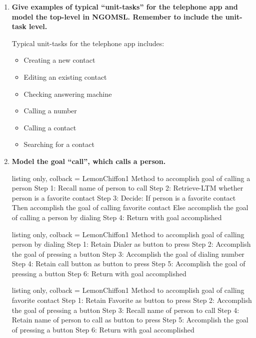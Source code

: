 \begin{enumerate}
\item \textbf{Give examples of typical ``unit-tasks'' for the telephone app and model the top-level in \ac{NGOMSL}. Remember to include the unit-task level.}

Typical unit-tasks for the telephone app includes:

\begin{itemize}
\item Creating a new contact
\item Editing an existing contact
\item Checking answering machine
\item Calling a number
\item Calling a contact
\item Searching for a contact
\end{itemize}

\item \textbf{Model the goal ``call'', which calls a person.}

\begin{tcblisting}{
    listing only,
    colback = LemonChiffon1
}
Method to accomplish goal of calling a person
Step 1: Recall name of person to call
Step 2: Retrieve-LTM whether person is a favorite contact
Step 3: Decide: If person is a favorite contact Then accomplish the goal of calling favorite contact Else accomplish the goal of calling a person by dialing
Step 4: Return with goal accomplished
\end{tcblisting}

\begin{tcblisting}{
    listing only,
    colback = LemonChiffon1
}
Method to accomplish goal of calling person by dialing
Step 1: Retain Dialer as button to press
Step 2: Accomplish the goal of pressing a button
Step 3: Accomplish the goal of dialing number
Step 4: Retain call button as button to press
Step 5: Accomplish the goal of pressing a button
Step 6: Return with goal accomplished
\end{tcblisting}

\begin{tcblisting}{
    listing only,
    colback = LemonChiffon1
}
Method to accomplish goal of calling favorite contact
Step 1: Retain Favorite as button to press
Step 2: Accomplish the goal of pressing a button
Step 3: Recall name of person to call
Step 4: Retain name of person to call as button to press
Step 5: Accomplish the goal of pressing a button
Step 6: Return with goal accomplished
\end{tcblisting}


\end{enumerate}
